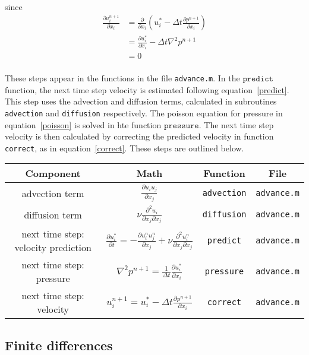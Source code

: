 \documentclass[12pt]{article}
\begin{document}
since
\begin{align*}
\frac{\partial  u_i^{n+1}}{\partial x_i} &= \frac{\partial}{\partial x_i}\left(u_i^* - \Delta t\frac{\partial p^{n+1}}{\partial x_i} \right) \\
&= \frac{\partial u_i^*}{\partial x_i} - \Delta t\nabla^2p^{n+1} \\
&= 0 \\
\end{align*}

These steps appear in the functions in the file \texttt{advance.m}.  In the $\texttt{predict}$ function, the next time step velocity is estimated following equation~\ref{predict}.  This step uses the advection and diffusion terms, calculated in subroutines \texttt{advection} and \texttt{diffusion} respectively.  The poisson equation for pressure in equation~\ref{poisson} is solved in hte function $\texttt{pressure}$.  The next time step velocity is then calculated by correcting the predicted velocity in function \texttt{correct}, as in equation~\ref{correct}.  These steps are outlined below.

\begin{center}
\begin{tabular}{|c|c|c|c|}
\hline 
\bf{Component} & \bf{Math} & \bf{Function} & \bf{File}\\ 
\hline 
advection term & $\frac{\partial u_i u_j}{\partial x_j}$ & \texttt{advection} & \texttt{advance.m}\\ 
\hline 
diffusion term & $\nu \frac{\partial^2 u_i}{\partial x_j \partial x_j}$ & \texttt{diffusion} & \texttt{advance.m} \\ 
\hline 
next time step: velocity prediction & $ \frac{\partial u_i^*}{\partial t} =   -\frac{\partial u_i^n u_j^n}{\partial x_j} + \nu \frac{\partial^2 u_i^n}{\partial x_j \partial x_j} $ & \texttt{predict}& \texttt{advance.m} \\ 
\hline 
next time step: pressure & $\nabla^2 p^{n+1} = \frac{1}{\Delta t}\frac{\partial u_i^*}{\partial x_i}$ & \texttt{pressure} & \texttt{advance.m}\\ 
\hline 
next time step: velocity & $u_i^{n+1}= u_i^* - \Delta t\frac{\partial p^{n+1}}{\partial x_i}$ & \texttt{correct}& \texttt{advance.m} \\ 
\hline 
\end{tabular} 
\end{center}

\subsection{Finite differences}
\end{document}
